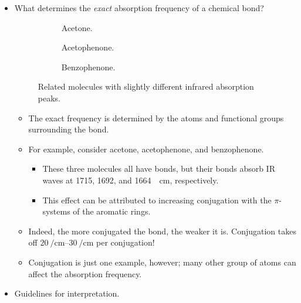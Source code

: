\documentclass[../notes.tex]{subfiles}
\begin{document}
\begin{itemize}
    \item What determines the \emph{exact} absorption frequency of a chemical bond?
    \begin{figure}[h!]
        \centering
        \footnotesize
        \begin{subfigure}[b]{0.25\linewidth}
            \centering
            \caption{Acetone.}
            \label{fig:IRexacta}
        \end{subfigure}
        \begin{subfigure}[b]{0.3\linewidth}
            \centering
            \caption{Acetophenone.}
            \label{fig:IRexactb}
        \end{subfigure}
        \begin{subfigure}[b]{0.3\linewidth}
            \centering
            \caption{Benzophenone.}
            \label{fig:IRexactc}
        \end{subfigure}
        \caption{Related molecules with slightly different infrared absorption peaks.}
        \label{fig:IRexact}
    \end{figure}
    \begin{itemize}
        \item The exact frequency is determined by the atoms and functional groups surrounding the bond.
        \item For example, consider acetone, acetophenone, and benzophenone.
        \begin{itemize}
            \item These three molecules all have  bonds, but their  bonds absorb IR waves at 1715, 1692, and \SI{1664}{\per\centi\meter}, respectively.
            \item This effect can be attributed to increasing conjugation with the $\pi$-systems of the aromatic rings.
        \end{itemize}
        \item Indeed, the more conjugated the  bond, the weaker it is. Conjugation takes off $\SIrange{20}{30}{\per\centi\meter}$ per conjugation!
        \item Conjugation is just one example, however; many other group of atoms can affect the absorption frequency.
    \end{itemize}
    \item Guidelines for interpretation.
    \begin{itemize}

\end{itemize}
\end{itemize}
\end{document}
